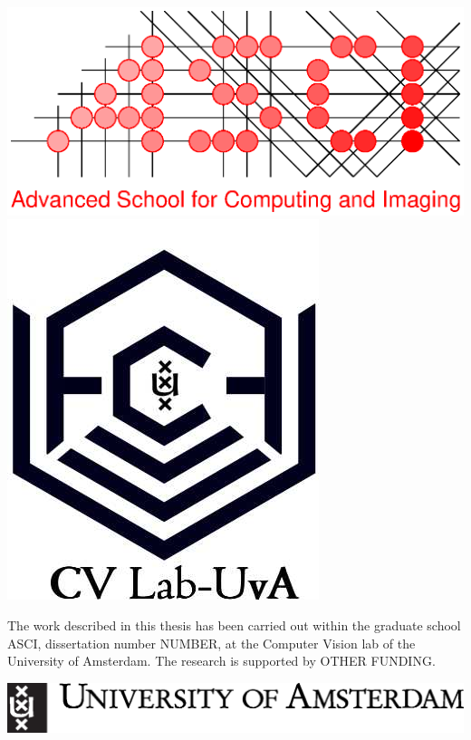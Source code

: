 
	\begin{center}
	    \includegraphics[width=.2\textwidth]{asci_logo.eps}
	    \includegraphics[width=.13\textwidth]{cv2.jpeg}
	\end{center}
	\noindent The work described in this thesis has been carried out within the
	graduate school ASCI, dissertation number {\color{red}NUMBER}, at the Computer
	Vision lab of the University of Amsterdam. The research is supported by {\color{red}OTHER FUNDING}.
	\\
	\begin{center}
	    \includegraphics[width=.4\textwidth]{uvalogo.eps}
	\end{center}
	